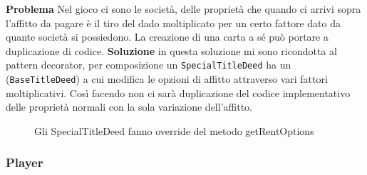 \textbf{Problema}\newline
Nel gioco ci sono le società, delle proprietà che quando ci arrivi sopra l’affitto da pagare è il tiro del dado moltiplicato per un certo fattore dato da quante società si possiedono. 
La creazione di una carta a sé può portare a duplicazione di codice. \newline
\textbf{Soluzione}\newline
in questa soluzione mi sono ricondotta al pattern decorator, per composizione un \texttt{SpecialTitleDeed} ha un (\texttt{BaseTitleDeed}) a cui modifica le opzioni di affitto attraverso vari fattori moltiplicativi.
Così facendo non ci sarà duplicazione del codice implementativo delle proprietà normali con la sola variazione dell'affitto.
\begin{figure}[H]
    \centering
    \caption{Gli SpecialTitleDeed fanno override del metodo getRentOptions}
    \label{img:ArchitectureDiagram-Pagina-3}
\end{figure}

\subsubsection{Player}

